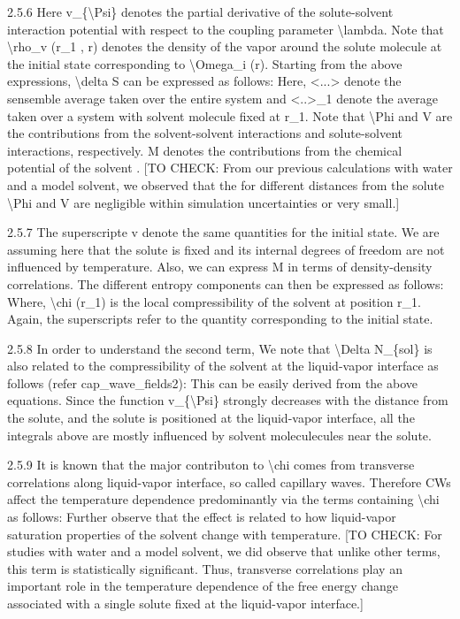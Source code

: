 \par 2.5.6 Here v\_\{\textbackslash Psi\} denotes the partial derivative of the solute-solvent interaction potential with respect to the coupling parameter \textbackslash lambda. Note that \textbackslash rho\_v (r\_1 , r) denotes the density of the vapor around the solute molecule at the initial state corresponding to \textbackslash Omega\_i (r). Starting from the above expressions, \textbackslash delta S can be expressed as follows: Here, <...> denote the sensemble average taken over the entire system and <..>\_1 denote the average taken over a system with solvent molecule fixed at r\_1.  Note that \textbackslash Phi and V are the contributions from the solvent-solvent interactions and solute-solvent interactions, respectively. M denotes the contributions from the chemical potential of the solvent . [TO CHECK: From our previous calculations with water and a model solvent, we observed that the for different distances from the solute \textbackslash Phi and V are negligible within simulation uncertainties or very small.]
\par 2.5.7 The superscripte v denote the same quantities for the initial state. We are assuming here that the solute is fixed and its internal degrees of freedom are not influenced by temperature. Also, we can express M in terms of density-density correlations. The different entropy components can then be expressed as follows: Where, \textbackslash chi (r\_1) is the local compressibility of the solvent at position r\_1. Again, the superscripts  refer to the quantity corresponding to the initial state.
\par 2.5.8 In order to understand the second term, We note that \textbackslash Delta N\_\{sol\} is also related to the compressibility of the solvent at the liquid-vapor interface as follows (refer cap\_wave\_fields2):  This can be easily derived from the above equations. Since the function v\_\{\textbackslash Psi\} strongly decreases with the distance from the solute, and the solute is positioned at the liquid-vapor interface, all the integrals above are mostly influenced by solvent moleculecules near the solute.
\par 2.5.9  It is known that the major contributon to \textbackslash chi comes from transverse correlations along liquid-vapor interface, so called capillary waves. Therefore CWs affect the temperature dependence predominantly via the terms containing \textbackslash chi as follows: Further observe that the effect is related to how liquid-vapor saturation properties of the solvent change with temperature. [TO CHECK: For studies with water and a model solvent, we did observe that unlike other terms, this term is statistically significant. Thus, transverse correlations play an important role in the temperature dependence of the free energy change associated with a single solute fixed at the liquid-vapor interface.]
